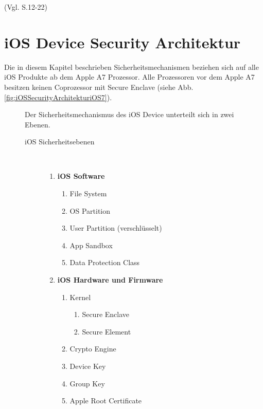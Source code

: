 (Vgl. \cite{Apple[6]} S.12-22)

\pagebreak
\section{iOS Device Security Architektur}
\label{sec:iOSSecArchitektur}

Die in diesem Kapitel beschrieben Sicherheitsmechanismen beziehen sich auf alle iOS Produkte ab dem Apple A7 Prozessor. Alle Prozessoren vor dem Apple A7 besitzen keinen Coprozessor mit Secure Enclave (siehe Abb. \ref{fig:iOSSecurityArchitekturiOS7}).\par

\begin{figure}[htb]
  \begin{minipage}{0.6\textwidth} 
  Der Sicherheitsmechanismus des iOS Device unterteilt sich in zwei Ebenen. 
  		\begin{description}
   			\item[ iOS Sicherheitsebenen]~\par
         		\begin{enumerate}	
				\item  \textbf{iOS Software}
					\begin{enumerate}
       						\item File System
         					\item OS Partition
						\item User Partition (verschlüsselt)
						\item App Sandbox
						\item Data Protection Class
      					\end{enumerate}
      				\item  \textbf{iOS Hardware und Firmware}~\par
					\begin{enumerate}
       						\item Kernel
						\begin{enumerate}
						\item Secure Enclave
						\item Secure Element
         					\end{enumerate}	
						\item Crypto Engine
						\item Device Key
						\item Group Key
						\item Apple Root Certificate
      					\end{enumerate}

\end{enumerate}
\end{description}
\end{minipage}
\end{figure}
